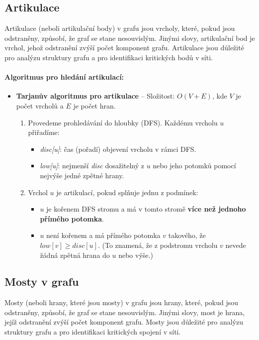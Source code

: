 \subsection{Artikulace}
Artikulace (neboli artikulační body) v grafu jsou vrcholy, které, pokud jsou 
odstraněny, způsobí, že graf se stane nesouvislým. Jinými slovy, artikulační bod je 
vrchol, jehož odstranění zvýší počet komponent grafu. Artikulace jsou důležité pro 
analýzu struktury grafu a pro identifikaci kritických bodů v síti.

\paragraph*{Algoritmus pro hledání artikulací:}
\begin{itemize}
    \label{para:artikulace}
\item \textbf{Tarjanův algoritmus pro artikulace} -- Složitost: $O(V + E)$, kde $V$ je počet vrcholů a $E$ je počet hran.
\begin{enumerate}
    \item Provedeme prohledávání do hloubky (DFS). Každému vrcholu $u$ přiřadíme: 
    \begin{itemize}
        \item \textit{disc[u]}: čas (pořadí) objevení vrcholu v rámci DFS.
        \item \textit{low[u]}: nejmenší \textit{disc} dosažitelný z $u$ nebo jeho potomků pomocí nejvýše jedné zpětné hrany.
    \end{itemize}
    \item Vrchol $u$ je artikulací, pokud splňuje jednu z podmínek:
    \begin{itemize}
        \item $u$ je kořenem DFS stromu a má v tomto stromě \textbf{více než jednoho přímého potomka}.
        \item $u$ není kořenem a má přímého potomka $v$ takového, že $low[v] \geq disc[u]$. (To znamená, že z podstromu vrcholu $v$ nevede žádná zpětná hrana do $u$ nebo výše.)
    \end{itemize}
\end{enumerate}
\end{itemize}

\subsection{Mosty v grafu}
Mosty (neboli hrany, které jsou mosty) v grafu jsou hrany, které, pokud jsou 
odstraněny, způsobí, že graf se stane nesouvislým. Jinými slovy, most je hrana, jejíž 
odstranění zvýší počet komponent grafu. Mosty jsou důležité pro analýzu struktury 
grafu a pro identifikaci kritických spojení v síti.

